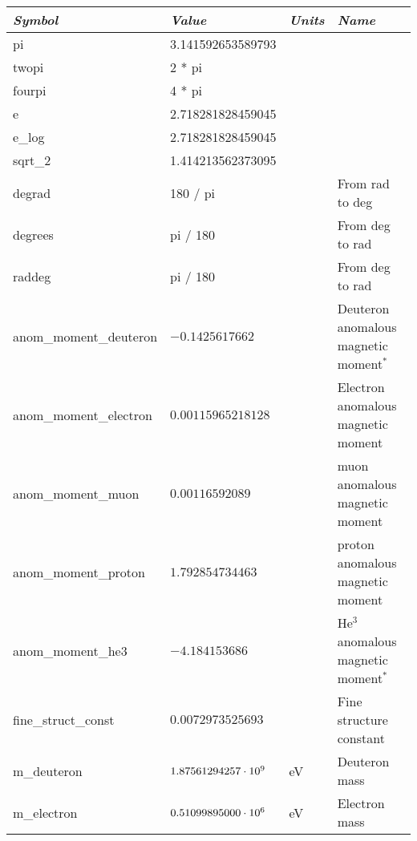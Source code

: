 {{{{{\begin{table}[h]
\centering
\begin{tabular}{llll} \toprule
  {\em Symbol}          & {\em Value}                & {\em Units} &  {\em Name}           \\ \midrule
  pi                    & 3.141592653589793          &             &                       \\
  twopi                 & 2 * pi                     &             &                       \\
  fourpi                & 4 * pi                     &             &                       \\
  e                     & 2.718281828459045          &             &                       \\
  e_log                 & 2.718281828459045          &             &                       \\
  sqrt_2                & 1.414213562373095          &             &                       \\
  degrad                & 180 / pi                   &             & From rad to deg       \\
  degrees               & pi / 180                   &             & From deg to rad       \\
  raddeg                & pi / 180                   &             & From deg to rad       \\
  anom_moment_deuteron  & $-0.1425617662$            &             & Deuteron anomalous magnetic moment$^*$ \\
  anom_moment_electron  & $0.00115965218128$         &             & Electron anomalous magnetic moment     \\
  anom_moment_muon      & $0.00116592089$            &             & muon anomalous magnetic moment         \\
  anom_moment_proton    & $1.792854734463$           &             & proton anomalous magnetic moment       \\
  anom_moment_he3       & $-4.184153686$             &             & He$^3$ anomalous magnetic moment$^*$   \\ 
  fine_struct_const     & $0.0072973525693$          &             & Fine structure constant                \\
  m_deuteron            & $1.87561294257 \cdot 10^{9}$    & eV          & Deuteron mass         \\
  m_electron            & $0.51099895000 \cdot 10^{6}$    & eV          & Electron mass         \\

\end{tabular}
\end{table}}}}}}
